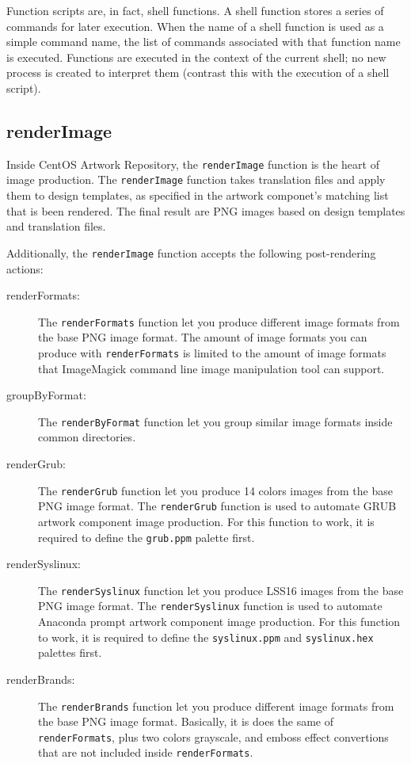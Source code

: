 \noindent Function scripts are, in fact, shell functions.  A shell
function stores a series of commands for later execution.  When the
name of a shell function is used as a simple command name, the list of
commands associated with that function name is executed.  Functions
are executed in the context of the current shell; no new process is
created to interpret them (contrast this with the execution  of a
shell script).

\subsection{renderImage}
\hypertarget{sec:Concepts:Scripts:Function:renderImage}{}
\label{sec:Concepts:Scripts:Function:renderImage}

Inside CentOS Artwork Repository, the \texttt{renderImage} function is
the heart of image production. The \texttt{renderImage} function takes
translation files and apply them to design templates, as specified in
the artwork componet's matching list that is been rendered. The final
result are PNG images based on design templates and translation files.

Additionally, the \texttt{renderImage} function accepts the following
post-rendering actions:

\begin{description}

\item[renderFormats:] The \texttt{renderFormats} function let you
produce different image formats from the base PNG image format.  The
amount of image formats you can produce with \texttt{renderFormats} is
limited to the amount of image formats that ImageMagick command line
image manipulation tool can support.

\item[groupByFormat:] The \texttt{renderByFormat} function let you
group similar image formats inside common directories.

\item[renderGrub:] The \texttt{renderGrub} function let you produce 14
colors images from the base PNG image format. The \texttt{renderGrub}
function is used to automate GRUB artwork component image production.
For this function to work, it is required to define the
\texttt{grub.ppm} palette first.

\item[renderSyslinux:] The \texttt{renderSyslinux} function let you
produce LSS16 images from the base PNG image format. The
\texttt{renderSyslinux} function is used to automate Anaconda prompt
artwork component image production.  For this function to work, it is
required to define the \texttt{syslinux.ppm} and \texttt{syslinux.hex}
palettes first.

\item[renderBrands:] The \texttt{renderBrands} function let you
produce different image formats from the base PNG image format.
Basically, it is does the same of \texttt{renderFormats}, plus two
colors grayscale, and emboss effect convertions that are not included
inside \texttt{renderFormats}.

\end{description}

